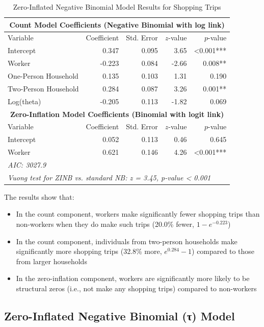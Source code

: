 \documentclass[12pt]{article}
\begin{document}
\begin{table}[h]
\centering
\caption{Zero-Inflated Negative Binomial Model Results for Shopping Trips}
\label{tab:zinb_results}
\begin{tabular}{lrrrr}
\toprule
\multicolumn{5}{c}{\textbf{Count Model Coefficients (Negative Binomial with log link)}} \\
\midrule
Variable & Coefficient & Std. Error & $z$-value & $p$-value \\
\midrule
Intercept & 0.347 & 0.095 & 3.65 & <0.001*** \\
Worker & -0.223 & 0.084 & -2.66 & 0.008** \\
One-Person Household & 0.135 & 0.103 & 1.31 & 0.190 \\
Two-Person Household & 0.284 & 0.087 & 3.26 & 0.001** \\
Log(theta) & -0.205 & 0.113 & -1.82 & 0.069 \\
\midrule
\multicolumn{5}{c}{\textbf{Zero-Inflation Model Coefficients (Binomial with logit link)}} \\
\midrule
Variable & Coefficient & Std. Error & $z$-value & $p$-value \\
\midrule
Intercept & 0.052 & 0.113 & 0.46 & 0.645 \\
Worker & 0.621 & 0.146 & 4.26 & <0.001*** \\
\bottomrule
\multicolumn{5}{l}{\textit{AIC: 3027.9}} \\
\multicolumn{5}{l}{\textit{Vuong test for ZINB vs. standard NB: z = 3.45, p-value < 0.001}}
\end{tabular}
\end{table}

The results show that:
\begin{itemize}
    \item In the count component, workers make significantly fewer shopping trips than non-workers when they do make such trips (20.0\% fewer, $1-e^{-0.223}$)
    \item In the count component, individuals from two-person households make significantly more shopping trips (32.8\% more, $e^{0.284}-1$) compared to those from larger households
    \item In the zero-inflation component, workers are significantly more likely to be structural zeros (i.e., not make any shopping trips) compared to non-workers
\end{itemize}

\subsection{Zero-Inflated Negative Binomial (τ) Model}
\end{document}
